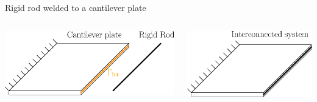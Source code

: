 \documentclass[aspectratio=169]{ISAE-Beamer}
\begin{document}
\begin{frame}{Rigid rod welded to a cantilever plate }
\begin{columns}
\begin{column}{.57\textwidth}
\begin{tcolorbox}
	\centering
	\includegraphics[height=0.355\textheight]{plate_rod_separated.eps}
\end{tcolorbox}
\end{column}

\begin{column}{.43\textwidth}
\begin{tcolorbox}
	\centering
	\includegraphics[height=0.355\textheight]{plate_rod_welded.eps}
\end{tcolorbox}	
\end{column}
\end{columns}


\end{frame}
\end{document}
